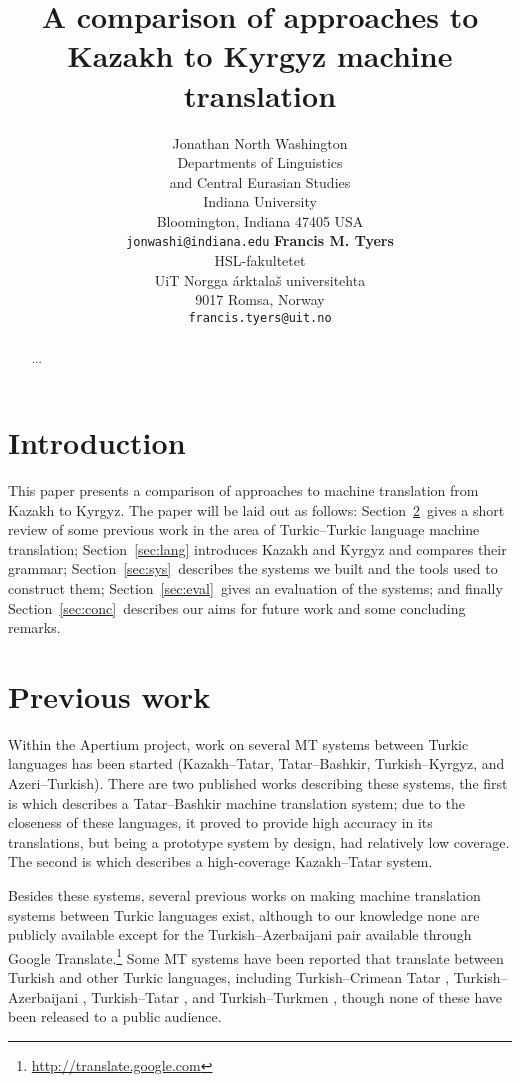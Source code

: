 \documentclass[11pt]{article}
\title{A comparison of approaches to Kazakh to Kyrgyz machine translation}
\author{
  Jonathan North Washington\\
  Departments of Linguistics\\
  and Central Eurasian Studies\\
  Indiana University\\
  Bloomington, Indiana 47405 USA\\
  \texttt{jonwashi@indiana.edu}  \And
  \textbf{Francis M. Tyers}\\
  HSL-fakultetet\\ 
  UiT Norgga \'{a}rktala\v{s} universitehta \\
  9017 Romsa, Norway \\
  {\tt francis.tyers@uit.no}
}
\date{}
\begin{document}
\maketitle

\begin{abstract}
...
\end{abstract}

\section{Introduction}

This paper presents a comparison of approaches to machine translation
from Kazakh to Kyrgyz.
The paper will be laid out as follows: Section~\ref{sec:prev}\ gives a short review of some previous work in the area of Turkic--Turkic language machine translation; Section~\ref{sec:lang} introduces Kazakh and Kyrgyz and compares their grammar;
Section~\ref{sec:sys}\ describes the systems we built and the tools used to construct them;
Section~\ref{sec:eval}\ gives an evaluation of the systems; and
finally Section~\ref{sec:conc}\ describes our aims for future work and some
concluding remarks.


\section{Previous work}
\label{sec:prev}

Within the Apertium project, work on several MT systems between Turkic languages has been started (Kazakh--Tatar, Tatar--Bashkir, Turkish--Kyrgyz, and Azeri--Turkish).  There are two published works describing these systems, the first is \cite{tyerswashingtonsalimzyanbattalov12} which describes a Tatar--Bashkir machine translation system; due to the closeness of these languages, it proved to provide high accuracy in its translations, but being a prototype system by design, had relatively low coverage. The second is \cite{tyerswashingtonsalimzyan13} which describes a high-coverage Kazakh--Tatar system.

Besides these systems, several previous works on making machine translation systems between Turkic languages 
exist, although to our knowledge none are publicly available except for the Turkish--Azerbaijani pair available through Google Translate.\footnote{\url{http://translate.google.com}}
Some MT systems have been reported that translate between Turkish and other Turkic languages, 
including Turkish--Crimean Tatar \citep{altintas01},
Turkish--Azerbaijani \citep{hamzaoglu93}, Turkish--Tatar \citep{suleymanov08}, and
Turkish--Turkmen \citep{tantug07}, though none of these have been released to a public audience. 
\end{document}
